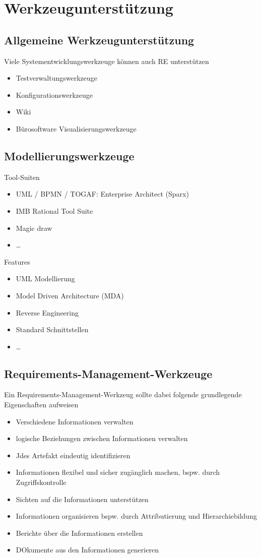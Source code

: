 \documentclass{report}
\theoremstyle{definition}
\theoremstyle{example}
\begin{document}
\section{Werkzeugunterstützung}

\subsection{Allgemeine Werkzeugunterstützung}
Viele Systementwicklungswerkzeuge können auch RE unterstützen
\begin{itemize}
   \item Testverwaltungswerkzeuge
   \item Konfigurationswerkzeuge
   \item Wiki
   \item Bürosoftware Visualisierungswerkzeuge
\end{itemize}

\subsection{Modellierungswerkzeuge}
Tool-Suiten
\begin{itemize}
   \item UML / BPMN / TOGAF: Enterprise Architect (Sparx)
   \item IMB Rational Tool Suite
   \item Magic draw
   \item \dots
\end{itemize}

Features
\begin{itemize}
   \item UML Modellierung
   \item Model Driven Architecture (MDA)
   \item Reverse Engineering
   \item Standard Schnittstellen
   \item \dots
\end{itemize}

\subsection{Requirements-Management-Werkzeuge}
Ein Requirements-Management-Werkzeug sollte dabei folgende grundlegende Eigenschaften aufweisen
\begin{itemize}
   \item Verschiedene Informationen verwalten
   \item logische Beziehungen zwischen Informationen verwalten
   \item Jdes Artefakt eindeutig identifizieren
   \item Informationen flexibel und sicher zugänglich machen, bspw. durch Zugriffskontrolle
   \item Sichten auf die Informationen unterstützen
   \item Informationen organisieren bspw. durch Attributierung und Hierarchiebildung
   \item Berichte über die Informationen erstellen
   \item DOkumente aus den Informationen generieren
\end{itemize}
\end{document}
